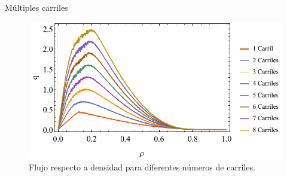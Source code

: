\documentclass[final]{beamer}
\newlength{\onecolwid}
\newlength{\twocolwid}
\begin{document}
\begin{frame}[t]
\begin{columns}[t]
\begin{column}{\twocolwid}
\begin{columns}[t,totalwidth=\twocolwid]
\begin{column}{\onecolwid}
\begin{block}{Múltiples carriles}
\begin{figure}
\includegraphics[width=0.8\linewidth]{img/flow_vs_density_multilane}
\caption{Flujo respecto a densidad para diferentes números de carriles.}
\end{figure}

\end{block}


\end{column} %

\end{columns} %



\begin{columns}[t,totalwidth=\twocolwid] %

\begin{column}{\onecolwid} %




\end{column} %

\begin{column}{\onecolwid} %





\end{column}
\end{columns}
\end{column}
\end{columns}
\end{frame}
\end{document}
